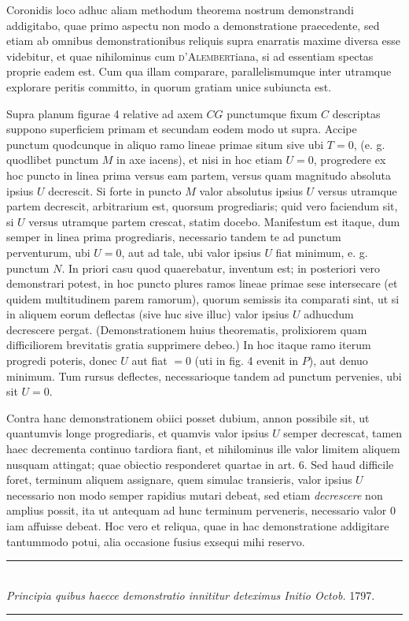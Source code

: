 Coronidis loco adhuc aliam methodum theorema nostrum demonstrandi addigitabo, quae primo aspectu non modo a demonstratione praecedente, sed etiam ab omnibus demonstrationibus reliquis supra enarratis maxime diversa esse videbitur, et quae nihilominus cum \textsc{d'Alembert}iana, si ad essentiam spectas proprie eadem est. Cum qua illam comparare, parallelismumque inter utramque explorare peritis committo, in quorum gratiam unice subiuncta est.

 Supra planum figurae 4 relative ad axem $CG$ punctumque fixum $C$ descriptas suppono superficiem primam et secundam eodem modo ut supra. Accipe punctum quodcunque in aliquo ramo lineae primae situm sive ubi $T=0$, (e. g. quodlibet punctum $M$ in axe iacens), et nisi in hoc etiam $U=0$, progredere ex hoc puncto in linea prima versus eam partem, versus quam magnitudo 
absoluta ipsius $U$ decrescit. Si forte in puncto $M$ valor absolutus ipsius $U$ versus utramque partem decrescit, arbitrarium est, quorsum progrediaris; quid vero faciendum sit, si $U$ versus utramque partem crescat, statim docebo. Manifestum est itaque, dum semper in linea prima progrediaris, necessario tandem te ad punctum perventurum, ubi $U=0$, aut ad tale, ubi valor ipsius $U$ fiat minimum, e. g. punctum $N$. In priori casu quod quaerebatur, inventum est; in posteriori vero demonstrari potest, in hoc puncto plures ramos lineae primae sese intersecare (et quidem multitudinem parem ramorum), quorum semissis ita comparati sint, ut si in aliquem eorum deflectas (sive huc sive illuc) valor ipsius $U$ adhucdum decrescere pergat. (Demonstrationem huius theorematis, prolixiorem quam difficiliorem brevitatis gratia supprimere debeo.) In hoc itaque ramo iterum progredi poteris, donec $U$ aut fiat $=0$ (uti in fig. 4 evenit in $P$), aut denuo minimum. Tum rursus deflectes, necessarioque tandem ad punctum pervenies, ubi sit $U=0$.

Contra hanc demonstrationem obiici posset dubium, annon possibile sit, ut quantumvis longe progrediaris, et quamvis valor ipsius $U$ semper decrescat, tamen haec decrementa continuo tardiora fiant, et nihilominus ille valor limitem aliquem nusquam attingat; quae obiectio responderet quartae in art. 6. Sed haud difficile foret, terminum aliquem assignare, quem simulac transieris, valor ipsius $U$ necessario non modo semper rapidius mutari debeat, sed etiam \textit{decrescere} non amplius possit, ita ut antequam ad hunc terminum perveneris, necessario valor 0 iam affuisse debeat. Hoc vero et reliqua, quae in hac demonstratione addigitare tantummodo potui, alia occasione fusius exsequi mihi reservo.

\begin{center}
\rule{8cm}{0.3pt}\\[8pt]
\textit{Principia quibus haecce demonstratio innititur deteximus Initio Octob.} 1797.\\[8pt]
\rule{5cm}{0.3pt}
\end{center}
